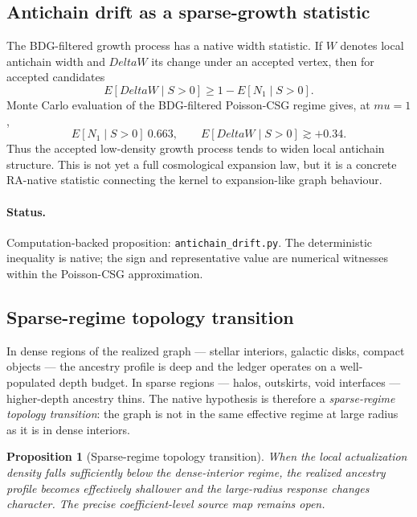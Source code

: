\documentclass[11pt]{article}
\def\Delta{Delta}%
\def\mu{mu}%
\def\mathbb#1{#1}%
\def\approx{~}%
\newtheorem{proposition}{Proposition}
\begin{document}
\subsection{Antichain drift as a sparse-growth statistic}

The BDG-filtered growth process has a native width statistic. If \(W\) denotes local antichain width and \(\Delta W\) its change under an accepted vertex, then for accepted candidates
\begin{equation}
\mathbb{E}[\Delta W\mid S>0]\ge 1-\mathbb{E}[N_1\mid S>0].
\end{equation}
Monte Carlo evaluation of the BDG-filtered Poisson-CSG regime gives, at \(\mu=1\),
\begin{equation}
\mathbb{E}[N_1\mid S>0]\approx0.663,
\qquad
\mathbb{E}[\Delta W\mid S>0]\gtrsim+0.34.
\end{equation}
Thus the accepted low-density growth process tends to widen local antichain structure. This is not yet a full cosmological expansion law, but it is a concrete RA-native statistic connecting the kernel to expansion-like graph behaviour.

\paragraph{Status.} Computation-backed proposition: \texttt{antichain\_drift.py}. The deterministic inequality is native; the sign and representative value are numerical witnesses within the Poisson-CSG approximation.

\subsection{Sparse-regime topology transition}

In dense regions of the realized graph --- stellar interiors, galactic disks, compact objects --- the ancestry profile is deep and the ledger operates on a well-populated depth budget. In sparse regions --- halos, outskirts, void interfaces --- higher-depth ancestry thins. The native hypothesis is therefore a \emph{sparse-regime topology transition}: the graph is not in the same effective regime at large radius as it is in dense interiors.

\begin{proposition}[Sparse-regime topology transition]
When the local actualization density falls sufficiently below the dense-interior regime, the realized ancestry profile becomes effectively shallower and the large-radius response changes character. The precise coefficient-level source map remains open.
\end{proposition}
\end{document}
